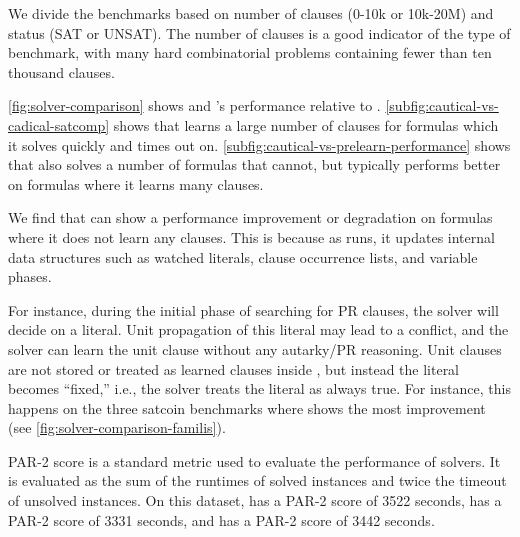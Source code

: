 We divide the benchmarks based on number of clauses (0-10k or 10k-20M) and
status (SAT or UNSAT). The number of clauses is a good indicator of the type of
benchmark, with many hard combinatorial problems containing fewer than ten
thousand clauses.

\autoref{fig:solver-comparison} shows \tool and \cadical's performance relative
to \cadical.
\autoref{subfig:cautical-vs-cadical-satcomp} shows that \tool learns a large
number of \pr clauses for formulas which it solves quickly and \cadical times
out on. \autoref{subfig:cautical-vs-prelearn-performance} shows that \prelearn
also solves a number of formulas that \tool cannot, but \tool typically performs
better on formulas where it learns many \pr clauses.

We find that \tool can show a performance improvement or degradation on formulas
where it does not learn any \pr clauses. This is because as \tool runs, it
updates internal data structures such as watched literals, clause occurrence
lists, and variable phases. 

For instance, during the initial phase of searching for PR clauses, the solver
will decide on a literal. Unit propagation of this literal may lead to a
conflict, and the solver can learn the unit clause without any autarky/PR
reasoning. Unit clauses are not stored or treated as learned clauses inside
\cadical, but instead the literal becomes “fixed,” i.e., the solver treats the
literal as always true. For instance, this happens on the three satcoin
benchmarks where \tool shows the most improvement (see
\autoref{fig:solver-comparison-familis}).


PAR-2 score is a standard metric used to evaluate the performance of solvers. It
is evaluated as the sum of the runtimes of solved instances and twice the
timeout of unsolved instances. On this dataset, \cadical has a PAR-2 score of
3522 seconds, \prelearn has a PAR-2 score of 3331 seconds, and \tool has a PAR-2
score of 3442 seconds. 

